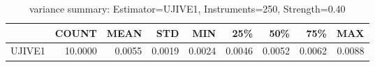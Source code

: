 \begin{table}[ht]
\centering
\caption{variance summary: Estimator=UJIVE1, Instruments=250, Strength=0.40}
\begin{tabular}{lrrrrrrrr}
\toprule
 & COUNT & MEAN & STD & MIN & 25\% & 50\% & 75\% & MAX \\
\midrule
UJIVE1 & 10.0000 & 0.0055 & 0.0019 & 0.0024 & 0.0046 & 0.0052 & 0.0062 & 0.0088 \\
\bottomrule
\end{tabular}
\end{table}
